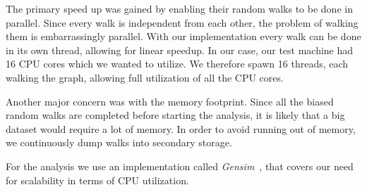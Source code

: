 The primary speed up was gained by enabling their random walks to be done in parallel. Since every walk is independent from each other, the problem of walking them is embarrassingly parallel. With our implementation every walk can be done in its own thread, allowing for linear speedup. In our case, our test machine had 16 CPU cores which we wanted to utilize. We therefore spawn 16 threads, each walking the graph, allowing full utilization of all the CPU cores.

Another major concern was with the memory footprint. Since all the biased random walks are completed before starting the analysis, it is likely that a big dataset would require a lot of memory. In order to avoid running out of memory, we continuously dump walks into secondary storage.

For the analysis we use an implementation called \emph{Gensim}~\cite{gensim}, that covers our need for scalability in terms of CPU utilization.
